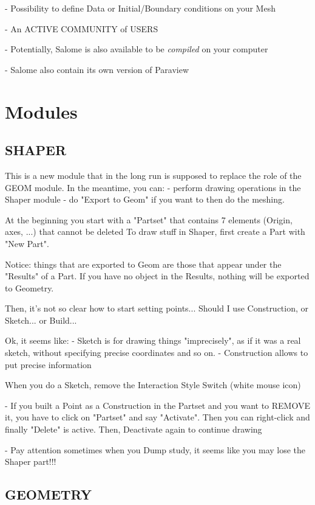\documentclass[10pt]{book}
\begin{document}
 - Possibility to define Data or Initial/Boundary conditions on your Mesh 

 - {An ACTIVE COMMUNITY of USERS}

 - Potentially, Salome is also available to be \textit{compiled} on your computer
 
 - Salome also contain its own version of Paraview

 
 
 \section{Modules}

 \subsection{SHAPER}


This is a new module that in the long run is supposed to replace the role of the GEOM module.
In the meantime, you can:
  - perform drawing operations in the Shaper module 
  - do "Export to Geom" if you want to then do the meshing.

At the beginning you start with a "Partset" that contains 7 elements (Origin, axes, ...) that cannot be deleted  
To draw stuff in Shaper, first create a Part with "New Part".

Notice: things that are exported to Geom are those that appear under the "Results" of a Part.
If you have no object in the Results, nothing will be exported to Geometry.

Then, it's not so clear how to start setting points... Should I use Construction, or Sketch... or Build...

Ok, it seems like:
 - Sketch is for drawing things "imprecisely", as if it was a real sketch, without specifying precise coordinates and so on.
 - Construction allows to put precise information

 When you do a Sketch, remove the Interaction Style Switch (white mouse icon)
 
 - If you built a Point as a Construction in the Partset and you want to REMOVE it, you have to click on "Partset" and say "Activate". 
   Then you can right-click and finally "Delete" is active. Then, Deactivate again to continue drawing

 - Pay attention sometimes when you Dump study, it seems like you may lose the Shaper part!!!  
   
 \subsection{GEOMETRY}
 
\end{document}
